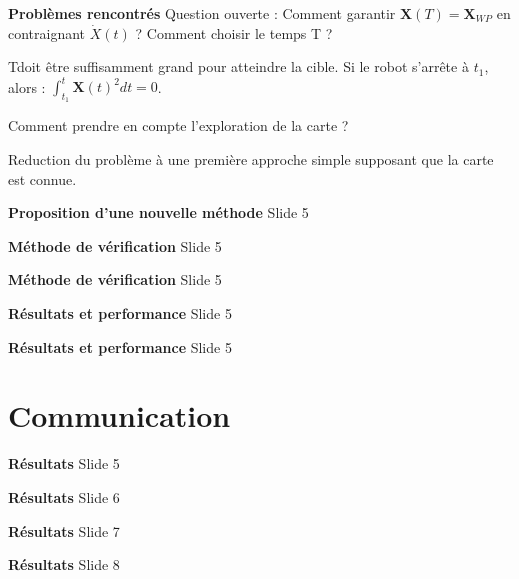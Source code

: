 \documentclass[aspectratio=169,10pt]{beamer}
\begin{document}
\begin{frame}{\textbf{Problèmes rencontrés}}
	Question ouverte :
		Comment garantir $\mathbf{X}(T)=\mathbf{X}_{WP}$ en contraignant $\dot{X}(t)$ ?
		Comment choisir le temps T ?
	
			Tdoit être suffisamment grand pour atteindre la cible.
			Si le robot s'arrête à $t_1$, alors :
			$\int_{t_1}^{t} \mathbf{X}(t)^{2} dt = 0$.
	
		Comment prendre en compte l'exploration de la carte ?

	Reduction du problème à une première approche simple supposant que la carte est connue.

\end{frame}

\begin{frame}{\textbf{Proposition d'une nouvelle méthode}}
    Slide 5
\end{frame}

\begin{frame}{\textbf{Méthode de vérification}}
    Slide 5
\end{frame}

\begin{frame}{\textbf{Méthode de vérification}}
    Slide 5
\end{frame}

\begin{frame}{\textbf{Résultats et performance}}
    Slide 5
\end{frame}

\begin{frame}{\textbf{Résultats et performance}}
    Slide 5
\end{frame}

\section{Communication}

\begin{frame}{\textbf{Résultats}}
    Slide 5
\end{frame}

\begin{frame}{\textbf{Résultats}}
    Slide 6
\end{frame}

\begin{frame}{\textbf{Résultats}}
    Slide 7
\end{frame}

\begin{frame}{\textbf{Résultats}}
    Slide 8
\end{frame}
\end{document}
